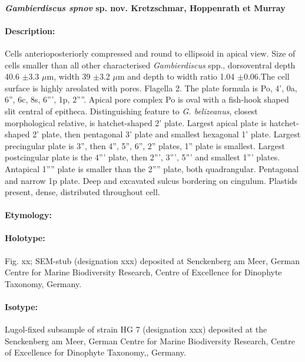 \documentclass[12pt]{article}
\begin{document}
 \paragraph{\textbf{\emph{Gambierdiscus spnov} sp. nov. Kretzschmar, Hoppenrath et Murray}}
 \paragraph{Description:} Cells anterioposteriorly compressed and round to ellipsoid in apical view. Size of cells smaller than all other characterised \emph{Gambierdiscus} spp., dorsoventral depth 40.6 $\pm$3.3 $\mu$m, width 39 $\pm$3.2 $\mu$m and depth to width ratio 1.04 $\pm$0.06.The cell surface is highly areolated with pores. Flagella 2. The plate formula is Po, 4', 0a, 6'', 6c, 8s, 6''', 1p, 2''''. 
Apical pore complex Po is oval with a fish-hook shaped slit central of epitheca. Distinguishing feature to \emph{G. belizeanus}, closest morphological relative, is hatchet-shaped 2' plate. Largest apical plate is hatchet-shaped 2' plate, then pentagonal 3' plate and smallest hexagonal 1' plate. Largest precingular plate is 3'', then 4'', 5'', 6'', 2'' plates, 1'' plate is smallest. Largest postcingular plate is the 4''' plate, then 2''', 3''', 5''' and smallest 1''' plates. Antapical 1'''' plate is smaller than the 2'''' plate, both quadrangular. Pentagonal and narrow 1p plate. Deep and excavated sulcus bordering on cingulum. Plastids present, dense, distributed throughout cell. 
 \paragraph{Etymology:} %
\paragraph{Holotype:} Fig. xx; SEM-stub (designation xxx) deposited at Senckenberg am Meer, German Centre for Marine Biodiversity Research, Centre of Excellence for Dinophyte Taxonomy, Germany.  \\

\paragraph{Isotype:}Lugol-fixed subsample of strain HG 7 (designation xxx) deposited at the Senckenberg am Meer, German Centre for Marine Biodiversity Research, Centre of Excellence for Dinophyte Taxonomy,, Germany.  \\
\end{document}
